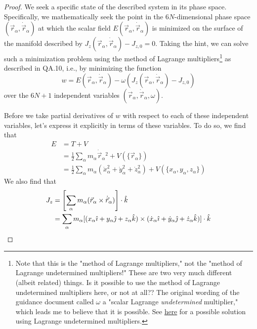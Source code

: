 \documentclass[../psets.tex]{subfiles}
\begin{document}
\begin{enumerate}
\begin{proof}
        We seek a specific state of the described system in its phase space. Specifically, we mathematically seek the point in the $6N$-dimensional phase space $(\vec{r}_\alpha,\dot{\vec{r}}_\alpha)$ at which the scalar field $E(\vec{r}_\alpha,\dot{\vec{r}}_\alpha)$ is minimized on the surface of the manifold described by $J_z(\vec{r}_\alpha,\dot{\vec{r}}_\alpha)-J_{z,0}=0$. Taking the hint, we can solve such a minimization problem using the method of Lagrange multipliers\footnote{Note that this is the "method of Lagrange multipliers," not the "method of Lagrange undetermined multipliers!" These are two very much different (albeit related) things. Is it possible to use the method of Lagrange undetermined multipliers here, or not at all?? The original wording of the guidance document called $\omega$ a "scalar Lagrange \emph{undetermined} multiplier," which leads me to believe that it is possible. See \href{https://askfilo.com/user-question-answers-physics/show-that-in-a-conservative-body-system-a-state-of-minimal-35393438393537}{here} for a possible solution using Lagrange undetermined multipliers.} as described in QA.10, i.e., by minimizing the function
        \begin{equation*}
            w = E(\vec{r}_\alpha,\dot{\vec{r}}_\alpha)-\omega(J_z(\vec{r}_\alpha,\dot{\vec{r}}_\alpha)-J_{z,0})
        \end{equation*}
        over the $6N+1$ independent variables $(\vec{r}_\alpha,\dot{\vec{r}}_\alpha,\omega)$.\par
        Before we take partial derivatives of $w$ with respect to each of these independent variables, let's express it explicitly in terms of these variables. To do so, we find that
        \begin{align*}
            E &= T+V\\
            &= \frac{1}{2}\sum_\alpha m_\alpha\dot{\vec{r}}_\alpha{}^2+V(\{\vec{r}_\alpha\})\\
            &= \frac{1}{2}\sum_\alpha m_\alpha(\dot{x}_\alpha^2+\dot{y}_\alpha^2+\dot{z}_\alpha^2)+V(\{x_\alpha,y_\alpha,z_\alpha\})
        \end{align*}
        We also find that
        \begin{align*}
            J_z &= \left[ \sum_\alpha m_\alpha(\vec{r}_\alpha\times\dot{\vec{r}}_\alpha) \right]\cdot\khat\\
            &= \sum_\alpha m_\alpha[(x_\alpha\ihat+y_\alpha\jhat+z_\alpha\khat)\times(\dot{x}_\alpha\ihat+\dot{y}_\alpha\jhat+\dot{z}_\alpha\khat)]\cdot\khat\\

\end{align*}
\end{proof}
\end{enumerate}
\end{document}
